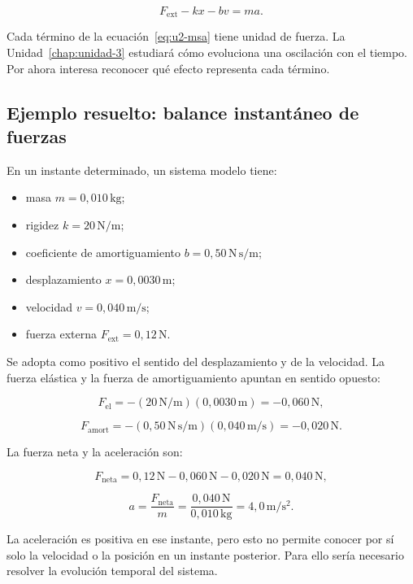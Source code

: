 \begin{equation}
    F_\mathrm{ext}-kx-bv=ma.
    \label{eq:u2-msa}
\end{equation}

Cada término de la ecuación~\eqref{eq:u2-msa} tiene unidad de fuerza. La Unidad~\ref{chap:unidad-3} estudiará cómo evoluciona una oscilación con el tiempo. Por ahora interesa reconocer qué efecto representa cada término.

\subsection{Ejemplo resuelto: balance instantáneo de fuerzas}
\label{sec:u2-ejemplo-msa}

En un instante determinado, un sistema modelo tiene:

\begin{itemize}
    \item masa \(m=0{,}010\,\text{kg}\);
    \item rigidez \(k=20\,\text{N}/\text{m}\);
    \item coeficiente de amortiguamiento \(b=0{,}50\,\text{N}\,\text{s}/\text{m}\);
    \item desplazamiento \(x=0{,}0030\,\text{m}\);
    \item velocidad \(v=0{,}040\,\text{m}/\text{s}\);
    \item fuerza externa \(F_\mathrm{ext}=0{,}12\,\text{N}\).
\end{itemize}

Se adopta como positivo el sentido del desplazamiento y de la velocidad. La fuerza elástica y la fuerza de amortiguamiento apuntan en sentido opuesto:

\[
    F_\mathrm{el}
    =-(20\,\text{N}/\text{m})(0{,}0030\,\text{m})
    =-0{,}060\,\text{N},
\]

\[
    F_\mathrm{amort}
    =-(0{,}50\,\text{N}\,\text{s}/\text{m})(0{,}040\,\text{m}/\text{s})
    =-0{,}020\,\text{N}.
\]

La fuerza neta y la aceleración son:

\[
    F_\mathrm{neta}
    =0{,}12\,\text{N}-0{,}060\,\text{N}-0{,}020\,\text{N}
    =0{,}040\,\text{N},
\]

\[
    a=\frac{F_\mathrm{neta}}{m}
    =\frac{0{,}040\,\text{N}}{0{,}010\,\text{kg}}
    =4{,}0\,\text{m}/\text{s}^{2}.
\]

La aceleración es positiva en ese instante, pero esto no permite conocer por sí solo la velocidad o la posición en un instante posterior. Para ello sería necesario resolver la evolución temporal del sistema.

